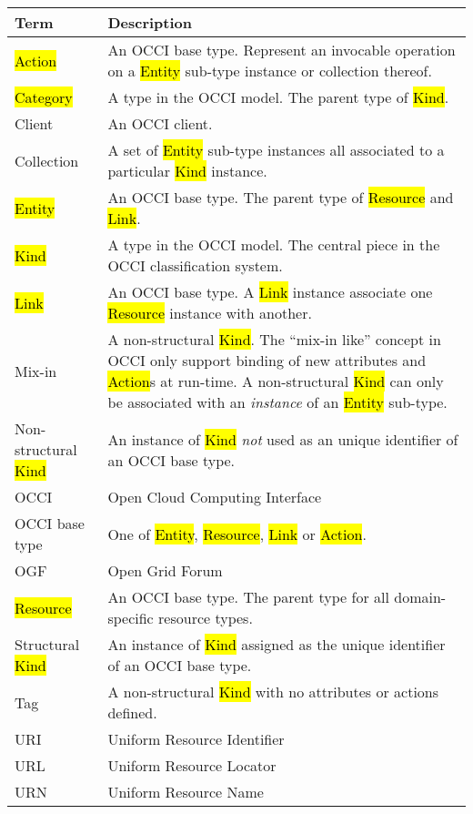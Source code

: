 \begin{tabular}{l|p{11cm}}
Term & Description \\
\hline
\hl{Action} & An OCCI base type. Represent an invocable operation on a \hl{Entity} sub-type instance or collection thereof. \\
\hl{Category} & A type in the OCCI model. The parent type of \hl{Kind}. \\
Client & An OCCI client.\\
Collection & A set of \hl{Entity} sub-type instances all associated to a particular \hl{Kind} instance. \\
\hl{Entity} & An OCCI base type. The parent type of \hl{Resource} and \hl{Link}. \\
\hl{Kind} & A type in the OCCI model. The central piece in the OCCI classification system. \\
\hl{Link} & An OCCI base type. A \hl{Link} instance associate one \hl{Resource} instance with another. \\
Mix-in & A non-structural \hl{Kind}. The ``mix-in like'' concept in OCCI only
  support binding of new attributes and \hl{Action}s at run-time. A
  non-structural \hl{Kind} can only be associated with an {\em instance} of an
  \hl{Entity} sub-type. \\
Non-structural \hl{Kind} & An instance of \hl{Kind} {\em not} used as an unique identifier of an OCCI base type. \\
OCCI & Open Cloud Computing Interface \\
OCCI base type & One of \hl{Entity}, \hl{Resource}, \hl{Link} or \hl{Action}. \\
OGF & Open Grid Forum \\
\hl{Resource} & An OCCI base type. The parent type for all domain-specific resource types. \\
Structural \hl{Kind} & An instance of \hl{Kind} assigned as the unique identifier of an OCCI base type. \\
Tag & A non-structural \hl{Kind} with no attributes or actions defined. \\
URI & Uniform Resource Identifier \\
URL & Uniform Resource Locator \\
URN & Uniform Resource Name \\
\end{tabular}
